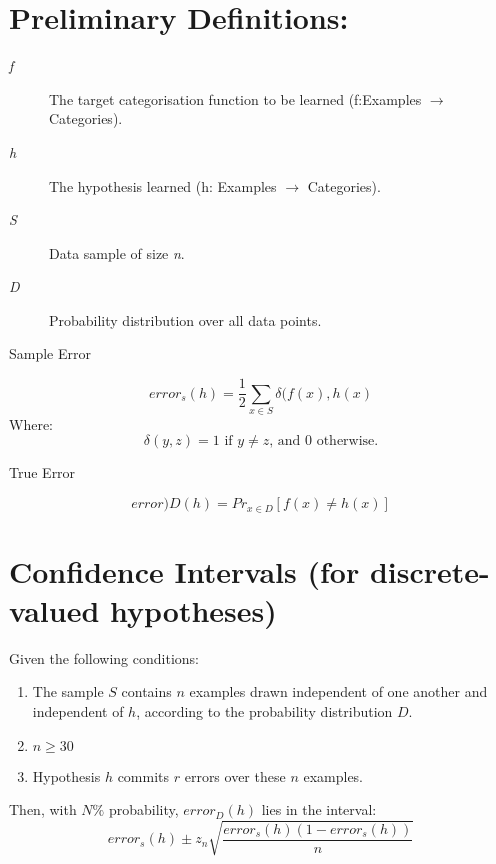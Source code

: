 \documentclass[11pt]{article}
\begin{document}
\section{Preliminary Definitions:}
\label{sec:orgd586c63}
\begin{description}
\item[{\emph{f}}] The target categorisation function to be learned (f:Examples \(\rightarrow\) Categories).
\item[{\emph{h}}] The hypothesis learned (h: Examples \(\rightarrow\) Categories).
\item[{\emph{S}}] Data sample of size \emph{n}.
\item[{\emph{D}}] Probability distribution over all data points.
\item[{Sample Error}] 
\end{description}
\begin{equation}
error_s(h) = \frac{1}{2}\sum\limits_{x\in S} \delta(f(x),h(x)
\end{equation}
Where:
\begin{equation}
\delta(y,z) = \text{1 if }y\neq z\text{, and 0 otherwise.}
\end{equation}
\begin{description}
\item[{True Error}] 
\end{description}
\begin{equation}
error)D(h) = Pr_{x \in D}[f(x)\neq h(x)]
\end{equation}

\section{Confidence Intervals (for discrete-valued hypotheses)}
\label{sec:org189091f}
Given the following conditions:
\begin{enumerate}
\item The sample \(S\) contains \(n\) examples drawn independent of one another and independent of \(h\), according to the probability distribution \(D\).
\item \(n \ge 30\)
\item Hypothesis \(h\) commits \(r\) errors over these \(n\) examples.
\end{enumerate}
Then, with \(N\%\) probability, \(error_D(h)\) lies in the interval:
\begin{equation}
error_s(h) \pm z_n \sqrt{\frac{error_s(h)(1-error_s(h))}{n}}
\end{equation}
\end{document}
